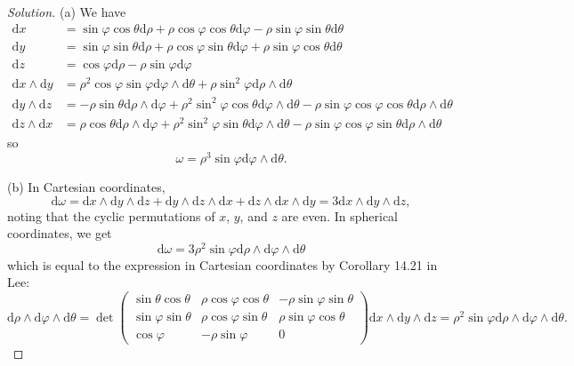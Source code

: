 \documentclass[10pt]{article}
\newcommand{\dd}{\mathrm{d}}
\newenvironment{soln}{\begin{proof}[Solution]}{\end{proof}}
\begin{document}
\begin{soln}
    (a) We have
    \begin{align*}
	\dd x
	&= \sin\varphi\cos\theta\dd\rho
	+ \rho\cos\varphi\cos\theta\dd\varphi
	- \rho\sin\varphi\sin\theta\dd\theta\\
	\dd y
	&= \sin\varphi\sin\theta\dd\rho
	+ \rho\cos\varphi\sin\theta\dd\varphi
	+ \rho\sin\varphi\cos\theta\dd\theta\\
	\dd z
	&= \cos\varphi\dd\rho - \rho\sin\varphi\dd\varphi\\
	\dd x\wedge\dd y
	&= \rho^2\cos\varphi\sin\varphi\dd\varphi\wedge\dd\theta
	+ \rho\sin^2\varphi\dd\rho\wedge\dd\theta\\
	\dd y\wedge\dd z
	&= -\rho\sin\theta\dd\rho\wedge\dd\varphi
	+ \rho^2\sin^2\varphi\cos\theta\dd\varphi\wedge\dd\theta
	- \rho\sin\varphi\cos\varphi\cos\theta\dd\rho\wedge\dd\theta
	\\
	\dd z\wedge\dd x
	&= \rho\cos\theta\dd\rho\wedge\dd\varphi
	+ \rho^2\sin^2\varphi\sin\theta\dd\varphi\wedge\dd\theta
	- \rho\sin\varphi\cos\varphi\sin\theta\dd\rho\wedge\dd\theta
    \end{align*}
    so
    \begin{equation*}
        \omega = \rho^3\sin\varphi\dd\varphi\wedge\dd\theta.
    \end{equation*}

    (b) In Cartesian coordinates,
    \begin{equation*}
        \dd\omega = \dd x\wedge\dd y\wedge\dd z
	+ \dd y\wedge \dd z \wedge\dd x
	+ \dd z\wedge\dd x\wedge\dd y
	= 3\dd x\wedge\dd y\wedge\dd z,
    \end{equation*}
    noting that the cyclic permutations of $x$, $y$, and $z$ are even.
    In spherical coordinates, we get
    \begin{equation*}
        \dd\omega = 3\rho^2\sin\varphi\dd\rho\wedge\dd\varphi\wedge\dd\theta
    \end{equation*}
    which is equal to the expression in Cartesian coordinates
    by Corollary 14.21 in Lee:
    \begin{equation*}
	\dd\rho\wedge\dd\varphi\wedge\dd\theta
        = \det \begin{pmatrix}
	    \sin\theta\cos\theta & \rho\cos\varphi\cos\theta &
	    -\rho\sin\varphi\sin\theta\\
	    \sin\varphi\sin\theta & \rho\cos\varphi\sin\theta &
	    \rho\sin\varphi\cos\theta\\
	    \cos\varphi & -\rho\sin\varphi & 0
        \end{pmatrix}\dd x\wedge\dd y\wedge\dd z
	= \rho^2\sin\varphi\dd\rho\wedge\dd\varphi\wedge\dd\theta.
    \end{equation*}


\end{soln}
\end{document}
